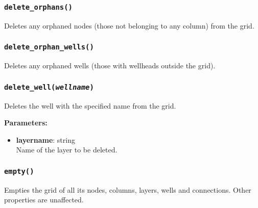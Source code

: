 \begin{snugshade}\subsubsection{\texttt{delete\_orphans()}}\end{snugshade}
\label{sec:mulgrid:delete_orphans}

Deletes any orphaned nodes (those not belonging to any column) from the grid.

\begin{snugshade}\subsubsection{\texttt{delete\_orphan\_wells()}}\end{snugshade}
\label{sec:mulgrid:delete_orphan_wells}

Deletes any orphaned wells (those with wellheads outside the grid).

\begin{snugshade}\subsubsection{\texttt{delete\_well(\emph{wellname})}}\end{snugshade}
\label{sec:mulgrid:delete_well}

Deletes the well with the specified name from the grid.

\textbf{Parameters:}
\begin{itemize}
\item \textbf{layername}: string\\
  Name of the layer to be deleted.
\end{itemize}

\begin{snugshade}\subsubsection{\texttt{empty()}}\end{snugshade}
\label{sec:mulgrid:empty}

Empties the grid of all its nodes, columns, layers, wells and connections.  Other properties are unaffected.

